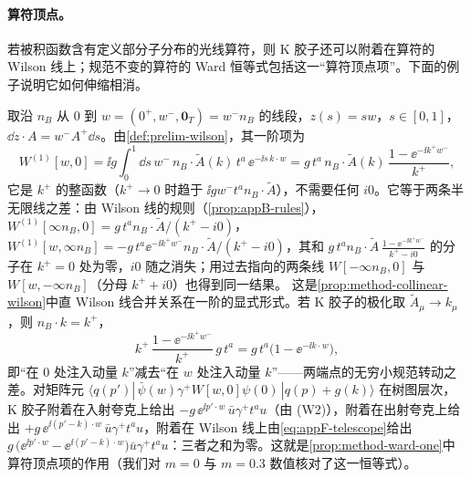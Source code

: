 \paragraph{算符顶点。}若被积函数含有定义部分子分布的光线算符，则 K 胶子还可以附着在算符的 Wilson 线上；规范不变的算符的 Ward 恒等式包括这一“算符顶点项”。下面的例子说明它如何伸缩相消。

\begin{example}\label{ex:appF-telescoping}
取沿 $n_B$ 从 $0$ 到 $w=(0^+,w^-,\mathbf 0_T)=w^-n_B$ 的线段，$z(s)=sw$，$s\in[0,1]$，$\dd z\cdot A=w^-A^+\dd s$。由\cref{def:prelim-wilson}，其一阶项为
\begin{equation}\label{eq:appF-finite}
W^{(1)}[w,0]=\ii g\int_0^1\!\dd s\,w^-\,n_B\cdot\tilde A(k)\,t^a\,\ee^{-\ii s\,k\cdot w}=g\,t^a\,n_B\cdot\tilde A(k)\,\frac{1-\ee^{-\ii k^+w^-}}{k^+} ,
\end{equation}
它是 $k^+$ 的整函数（$k^+\to0$ 时趋于 $\ii gw^-t^an_B\cdot\tilde A$），不需要任何 $i0$。它等于两条半无限线之差：由 Wilson 线的规则（\cref{prop:appB-rules}），
$W^{(1)}[\infty n_B,0]=g\,t^an_B\cdot\tilde A/(k^+-i0)$，$W^{(1)}[w,\infty n_B]=-g\,t^a\ee^{-\ii k^+w^-}n_B\cdot\tilde A/(k^+-i0)$，其和
$g\,t^an_B\cdot\tilde A\,\frac{1-\ee^{-\ii k^+w^-}}{k^+-i0}$ 的分子在 $k^+=0$ 处为零，$i0$ 随之消失；用过去指向的两条线 $W[-\infty n_B,0]$ 与 $W[w,-\infty n_B]$（分母 $k^++i0$）也得到同一结果。
这是\cref{prop:method-collinear-wilson}中直 Wilson 线合并关系在一阶的显式形式。若 K 胶子的极化取 $\tilde A_\mu\to k_\mu$，则 $n_B\cdot k=k^+$，
\begin{equation}\label{eq:appF-telescope}
k^+\,\frac{1-\ee^{-\ii k^+w^-}}{k^+}\,g\,t^a=g\,t^a\bigl(1-\ee^{-\ii k\cdot w}\bigr) ,
\end{equation}
即“在 $0$ 处注入动量 $k$”减去“在 $w$ 处注入动量 $k$”——两端点的无穷小规范转动之差。对矩阵元 $\langle q(p')|\,\bar\psi(w)\gamma^+W[w,0]\psi(0)\allowbreak\,|q(p)+g(k)\rangle$ 在树图层次，
K 胶子附着在入射夸克上给出 $-g\,\ee^{\ii p'\cdot w}\,\bar u\gamma^+t^au$（由 (W2)），附着在出射夸克上给出 $+g\,\ee^{\ii(p'-k)\cdot w}\,\bar u\gamma^+t^au$，附着在 Wilson 线上由\cref{eq:appF-telescope}给出
$g\,\bigl(\ee^{\ii p'\cdot w}-\ee^{\ii(p'-k)\cdot w}\bigr)\bar u\gamma^+t^au$：三者之和为零。这就是\cref{prop:method-ward-one}中算符顶点项的作用（我们对 $m=0$ 与 $m=0.3$ 数值核对了这一恒等式）。%
\end{example}

